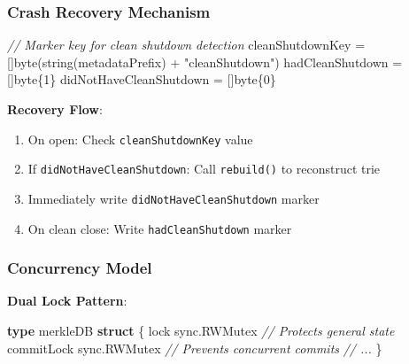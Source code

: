 \documentclass[
]{article}
\newenvironment{Shaded}{}{}
\newcommand{\CommentTok}[1]{\textcolor[rgb]{0.38,0.63,0.69}{\textit{#1}}}
\newcommand{\DataTypeTok}[1]{\textcolor[rgb]{0.56,0.13,0.00}{#1}}
\newcommand{\DecValTok}[1]{\textcolor[rgb]{0.25,0.63,0.44}{#1}}
\newcommand{\KeywordTok}[1]{\textcolor[rgb]{0.00,0.44,0.13}{\textbf{#1}}}
\newcommand{\NormalTok}[1]{#1}
\newcommand{\OperatorTok}[1]{\textcolor[rgb]{0.40,0.40,0.40}{#1}}
\newcommand{\StringTok}[1]{\textcolor[rgb]{0.25,0.44,0.63}{#1}}
\providecommand{\tightlist}{%
  \setlength{\itemsep}{0pt}\setlength{\parskip}{0pt}}
\begin{document}
\subsubsection{Crash Recovery Mechanism}\label{crash-recovery-mechanism}

\begin{Shaded}
\begin{Highlighting}[]
\CommentTok{// Marker key for clean shutdown detection}
\NormalTok{cleanShutdownKey }\OperatorTok{=} \OperatorTok{[]}\DataTypeTok{byte}\OperatorTok{(}\DataTypeTok{string}\OperatorTok{(}\NormalTok{metadataPrefix}\OperatorTok{)} \OperatorTok{+} \StringTok{"cleanShutdown"}\OperatorTok{)}
\NormalTok{hadCleanShutdown }\OperatorTok{=} \OperatorTok{[]}\DataTypeTok{byte}\OperatorTok{\{}\DecValTok{1}\OperatorTok{\}}
\NormalTok{didNotHaveCleanShutdown }\OperatorTok{=} \OperatorTok{[]}\DataTypeTok{byte}\OperatorTok{\{}\DecValTok{0}\OperatorTok{\}}
\end{Highlighting}
\end{Shaded}

\textbf{Recovery Flow}:

\begin{enumerate}
\def\labelenumi{\arabic{enumi}.}
\tightlist
\item
  On open: Check \texttt{cleanShutdownKey} value
\item
  If \texttt{didNotHaveCleanShutdown}: Call \texttt{rebuild()} to
  reconstruct trie
\item
  Immediately write \texttt{didNotHaveCleanShutdown} marker
\item
  On clean close: Write \texttt{hadCleanShutdown} marker
\end{enumerate}

\subsubsection{Concurrency Model}\label{concurrency-model}

\textbf{Dual Lock Pattern}:

\begin{Shaded}
\begin{Highlighting}[]
\KeywordTok{type}\NormalTok{ merkleDB }\KeywordTok{struct} \OperatorTok{\{}
\NormalTok{    lock       sync}\OperatorTok{.}\NormalTok{RWMutex  }\CommentTok{// Protects general state}
\NormalTok{    commitLock sync}\OperatorTok{.}\NormalTok{RWMutex  }\CommentTok{// Prevents concurrent commits}
    \CommentTok{// ...}
\OperatorTok{\}}
\end{Highlighting}
\end{Shaded}
\end{document}
